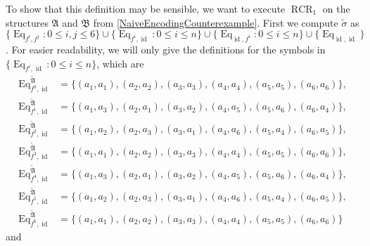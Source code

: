 \documentclass[a4paper,11pt,DIV=15]{scrartcl} %
\theoremstyle{plain}
\theoremstyle{definition}
\newcommand{\RCR}{\operatorname{RCR}}
\begin{document}
To show that this definition may be sensible, we want to execute $\RCR_1$ on the structures $\mathfrak A$ and $\mathfrak B$ from \cref{NaiveEncodingCounterexample}.
First we compute $\widetilde\sigma$ as $\{\operatorname{Eq}_{f^i,f^j} : 0\leq i,j \leq 6\}\cup\{\operatorname{Eq}_{f^i,\operatorname{id}} : 0 \leq i \leq n\} \cup \{\operatorname{Eq}_{\operatorname{id},f^i} : 0 \leq i \leq n\}\cup\{\operatorname{Eq}_{\operatorname{id},\operatorname{id}}\}$. 
For easier readability, we will only give the definitions for the symbols in $\{\operatorname{Eq}_{f^i,\operatorname{id}} : 0 \leq i \leq n\}$, which are
\begin{align*}
	\operatorname{Eq}_{f^0,\operatorname{id}}^{\widetilde{\mathfrak A}}&=\{(a_1, a_1), (a_2, a_2),(a_3, a_3), (a_4, a_4), (a_5, a_5), (a_6, a_6)\}, \\
	\operatorname{Eq}_{f^1,\operatorname{id}}^{\widetilde{\mathfrak A}}&=\{(a_1, a_3), (a_2, a_1),(a_3, a_2), (a_4, a_5), (a_5, a_6), (a_6, a_4)\}, \\
	\operatorname{Eq}_{f^2,\operatorname{id}}^{\widetilde{\mathfrak A}}&=\{(a_1, a_2), (a_2, a_3),(a_3, a_1), (a_4, a_6), (a_5, a_4), (a_6, a_5)\}, \\
	\operatorname{Eq}_{f^3,\operatorname{id}}^{\widetilde{\mathfrak A}}&=\{(a_1, a_1), (a_2, a_2),(a_3, a_3), (a_4, a_4), (a_5, a_5), (a_6, a_6)\}, \\
	\operatorname{Eq}_{f^4,\operatorname{id}}^{\widetilde{\mathfrak A}}&=\{(a_1, a_3), (a_2, a_1),(a_3, a_2), (a_4, a_5), (a_5, a_6), (a_6, a_4)\}, \\
	\operatorname{Eq}_{f^5,\operatorname{id}}^{\widetilde{\mathfrak A}}&=\{(a_1, a_2), (a_2, a_3),(a_3, a_1), (a_4, a_6), (a_5, a_4), (a_6, a_5)\}, \\
	\operatorname{Eq}_{f^6,\operatorname{id}}^{\widetilde{\mathfrak A}}&=\{(a_1, a_1), (a_2, a_2),(a_3, a_3), (a_4, a_4), (a_5, a_5), (a_6, a_6)\}
\end{align*}
and 
\end{document}
